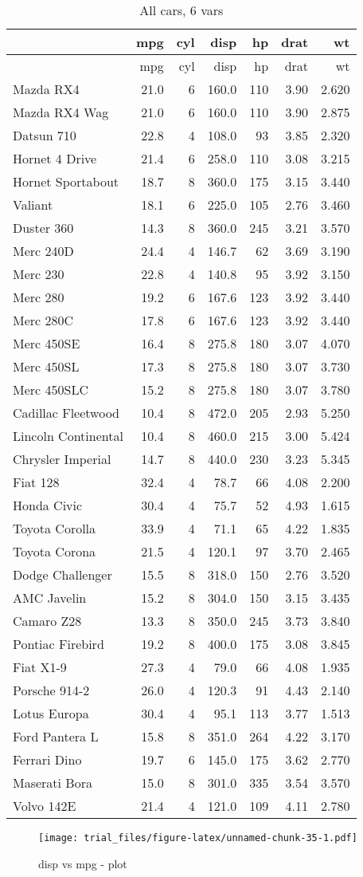 \documentclass[]{article}
\begin{document}
\begin{longtable}[]{@{}lrrrrrr@{}}
\caption{All cars, 6 vars}\tabularnewline
\toprule
& mpg & cyl & disp & hp & drat & wt\tabularnewline
\midrule
\endfirsthead
\toprule
& mpg & cyl & disp & hp & drat & wt\tabularnewline
\midrule
\endhead
Mazda RX4 & 21.0 & 6 & 160.0 & 110 & 3.90 & 2.620\tabularnewline
Mazda RX4 Wag & 21.0 & 6 & 160.0 & 110 & 3.90 & 2.875\tabularnewline
Datsun 710 & 22.8 & 4 & 108.0 & 93 & 3.85 & 2.320\tabularnewline
Hornet 4 Drive & 21.4 & 6 & 258.0 & 110 & 3.08 & 3.215\tabularnewline
Hornet Sportabout & 18.7 & 8 & 360.0 & 175 & 3.15 & 3.440\tabularnewline
Valiant & 18.1 & 6 & 225.0 & 105 & 2.76 & 3.460\tabularnewline
Duster 360 & 14.3 & 8 & 360.0 & 245 & 3.21 & 3.570\tabularnewline
Merc 240D & 24.4 & 4 & 146.7 & 62 & 3.69 & 3.190\tabularnewline
Merc 230 & 22.8 & 4 & 140.8 & 95 & 3.92 & 3.150\tabularnewline
Merc 280 & 19.2 & 6 & 167.6 & 123 & 3.92 & 3.440\tabularnewline
Merc 280C & 17.8 & 6 & 167.6 & 123 & 3.92 & 3.440\tabularnewline
Merc 450SE & 16.4 & 8 & 275.8 & 180 & 3.07 & 4.070\tabularnewline
Merc 450SL & 17.3 & 8 & 275.8 & 180 & 3.07 & 3.730\tabularnewline
Merc 450SLC & 15.2 & 8 & 275.8 & 180 & 3.07 & 3.780\tabularnewline
Cadillac Fleetwood & 10.4 & 8 & 472.0 & 205 & 2.93 &
5.250\tabularnewline
Lincoln Continental & 10.4 & 8 & 460.0 & 215 & 3.00 &
5.424\tabularnewline
Chrysler Imperial & 14.7 & 8 & 440.0 & 230 & 3.23 & 5.345\tabularnewline
Fiat 128 & 32.4 & 4 & 78.7 & 66 & 4.08 & 2.200\tabularnewline
Honda Civic & 30.4 & 4 & 75.7 & 52 & 4.93 & 1.615\tabularnewline
Toyota Corolla & 33.9 & 4 & 71.1 & 65 & 4.22 & 1.835\tabularnewline
Toyota Corona & 21.5 & 4 & 120.1 & 97 & 3.70 & 2.465\tabularnewline
Dodge Challenger & 15.5 & 8 & 318.0 & 150 & 2.76 & 3.520\tabularnewline
AMC Javelin & 15.2 & 8 & 304.0 & 150 & 3.15 & 3.435\tabularnewline
Camaro Z28 & 13.3 & 8 & 350.0 & 245 & 3.73 & 3.840\tabularnewline
Pontiac Firebird & 19.2 & 8 & 400.0 & 175 & 3.08 & 3.845\tabularnewline
Fiat X1-9 & 27.3 & 4 & 79.0 & 66 & 4.08 & 1.935\tabularnewline
Porsche 914-2 & 26.0 & 4 & 120.3 & 91 & 4.43 & 2.140\tabularnewline
Lotus Europa & 30.4 & 4 & 95.1 & 113 & 3.77 & 1.513\tabularnewline
Ford Pantera L & 15.8 & 8 & 351.0 & 264 & 4.22 & 3.170\tabularnewline
Ferrari Dino & 19.7 & 6 & 145.0 & 175 & 3.62 & 2.770\tabularnewline
Maserati Bora & 15.0 & 8 & 301.0 & 335 & 3.54 & 3.570\tabularnewline
Volvo 142E & 21.4 & 4 & 121.0 & 109 & 4.11 & 2.780\tabularnewline
\bottomrule
\end{longtable}

\begin{figure}[htbp]
\centering
\texttt{[image: trial\_files/figure-latex/unnamed-chunk-35-1.pdf]}
\caption{disp vs mpg - plot}
\end{figure}
\end{document}

